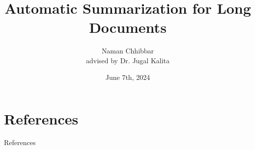\documentclass{beamer}
\title[Long Document Summarization]{Automatic Summarization for Long Documents}
\author[Naman Chhibbar]{
  Naman Chhibbar \\
  \textup{\scriptsize advised by Dr. Jugal Kalita}
}
\institute{University of Colorado, Colorado Springs}
\date{June 7th, 2024}
\begin{document}
\begin{frame}
  \titlepage
\end{frame}






\section{References}

\begin{frame}{References}
\tiny

\nocite{*}


  
\end{frame}
\end{document}
